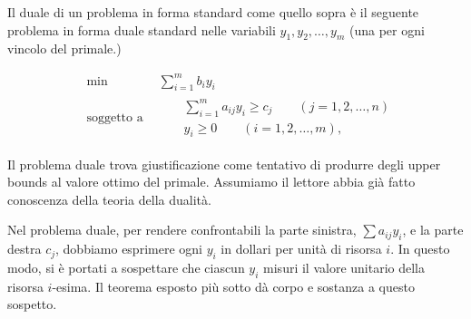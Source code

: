 \documentclass[a4paper,11pt]{article}
\begin{document}
        Il duale di un problema in forma standard come quello sopra
        \`e il seguente problema in forma duale standard
        nelle variabili $y_1,y_2,\ldots,y_m$ (una per ogni vincolo del primale.)

        \begin{equation}\begin{split}
	&\text{min}\qquad\qquad\sum_{i=1}^{m}b_iy_i\\
	&\text{soggetto a} \qquad\begin{split} &\sum_{i=1}^{m}a_{ij}y_i \geq c_j \qquad(j=1,2,\ldots,n)\\
	&y_i\geq0 \qquad(i=1,2,\ldots,m),\end{split}
	\end{split} 
	\end{equation}

        Il problema duale trova giustificazione come tentativo di produrre degli upper bounds al valore ottimo del primale.
        Assumiamo il lettore abbia gi\`a fatto conoscenza della teoria della dualit\`a.
        
	Nel problema duale, per rendere confrontabili la parte sinistra, $\sum a_{ij}y_i$, e la parte destra $c_j$, dobbiamo esprimere ogni $y_i$ in dollari per unità di risorsa $i$. In questo modo, si è portati a sospettare che ciascun $y_i$ misuri il valore unitario della risorsa $i$-esima. Il teorema esposto più sotto dà corpo e sostanza a questo sospetto.\\
        
\end{document}
